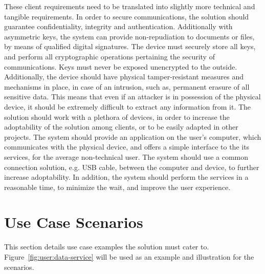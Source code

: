 These client requirements need to be translated into slightly more technical and tangible requirements. In order to secure communications, the solution should guarantee confidentiality, integrity and authentication.
Additionally with asymmetric keys, the system can provide non-repudiation to documents or files, by means of qualified digital signatures.
The device must securely store all keys, and perform all cryptographic operations pertaining the security of communications. Keys must never be exposed unencrypted to the outside.
Additionally, the device should have physical tamper-resistant measures and mechanisms in place, in case of an intrusion, such as, permanent erasure of all sensitive data. 
This means that even if an attacker is in possession of the physical device, it should be extremely difficult to extract any information from it.
The solution should work with a plethora of devices, in order to increase the adoptability of the solution among clients, or to be easily adapted in other projects.
The system should provide an application on the user's computer, which communicates with the physical device, and offers a simple interface to the its services, for the average non-technical user.
The system should use a common connection solution, e.g. \ac{USB} cable, between the computer and device, to further increase adoptability.
In addition, the system should perform the services in a reasonable time, to minimize the wait, and improve the user experience.


\section{Use Case Scenarios}\label{chap:problem:scenarios}

This section details use case examples the solution must cater to. Figure~\ref{fig:user:data-service} will be used as an example and illustration for the scenarios.

